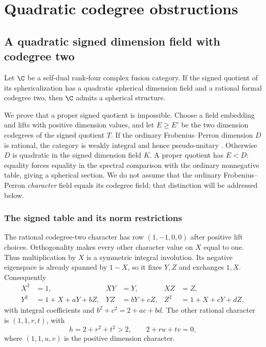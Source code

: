 \section{Quadratic codegree obstructions}\label{sec:quad}
\subsection{A quadratic signed dimension field with codegree two}

\begin{theorem}\label{quad:thm:quadratic-signed-codegree-two}
Let $\C$ be a self-dual rank-four complex fusion category.
If the signed quotient of its sphericalization has a quadratic
spherical dimension field and a rational formal codegree two, then
$\C$ admits a spherical structure.
\end{theorem}

We prove that a proper signed quotient is impossible. Choose a field
embedding and lifts with positive dimension values, and let $E\ge E'$
be the two dimension codegrees of the signed quotient $T$.
If the ordinary Frobenius--Perron dimension $D$ is rational, the
category is weakly integral and hence pseudo-unitary \cite{ENO}.
Otherwise $D$ is quadratic in the signed dimension field $K$.
A proper quotient has $E<D$: equality forces equality in the spectral
comparison with the ordinary nonnegative table, giving a spherical
section. We do not assume that the ordinary Frobenius--Perron
\emph{character} field equals its codegree field; that distinction
will be addressed below.

\subsubsection{The signed table and its norm restrictions}

The rational codegree-two character has row $(1,-1,0,0)$ after
positive lift choices. Orthogonality makes every other character
value on $X$ equal to one. Thus multiplication by $X$ is a symmetric
integral involution. Its negative eigenspace is already spanned by
$1-X$, so it fixes $Y,Z$ and exchanges $1,X$. Consequently
\begin{equation}\label{quad:eq:quad-two-table}
 \begin{aligned}
 X^2&=1,&XY&=Y,&XZ&=Z,\\
 Y^2&=1+X+aY+bZ,&YZ&=bY+cZ,&Z^2&=1+X+cY+dZ,
 \end{aligned}
\end{equation}
with integral coefficients and $b^2+c^2=2+ac+bd$.
The other rational character is $(1,1,r,t)$, with
\[
 h=2+r^2+t^2>2,\qquad 2+ru+tv=0,
\]
where $(1,1,u,v)$ is the positive dimension character.

